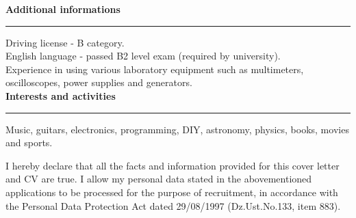 \documentclass{article}
\newcommand{\header}[1] 
{
	\textbf{\large #1}
	\vspace{0.005\textheight}
	\hrule 
	\vspace{0.005\textheight}
}
\begin{document}

\header{Additional informations}
Driving license - B category.\\
English language - passed B2 level exam (required by university).\\
Experience in using various laboratory equipment such as multimeters, oscilloscopes, power supplies and generators.\\
\header{Interests and activities}
Music, guitars, electronics, programming, DIY, astronomy, physics, books, movies and sports.
\vspace{0.05\textheight}
\noindent\newline
\scriptsize
\begin{minipage}{\textwidth}
	I hereby declare that all the facts and information provided for this cover letter and CV are true. I allow my personal data stated in the abovementioned applications to be processed for the purpose of recruitment, in accordance with the Personal Data Protection Act dated 29/08/1997 (Dz.Ust.No.133, item 883).
\end{minipage}
\end{document}
